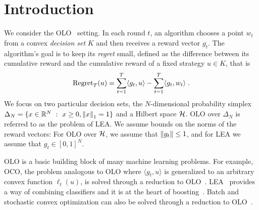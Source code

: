 \section{Introduction}
\label{section:introduction}

\vspace{-0.2cm}

We consider the \ac{OLO}~\cite{Cesa-Bianchi-Lugosi-2006, Shalev-Shwartz-2011}
setting. In each round $t$, an algorithm chooses a point $w_t$ from a convex
\emph{decision set} $K$ and then receives a reward vector $g_t$. The
algorithm's goal is to keep its \emph{regret} small, defined as the difference
between its cumulative reward and the cumulative reward of a fixed strategy $u
\in K$, that is
\vspace{-.1cm}
\[
\operatorname{Regret}_T(u) = \sum_{t=1}^T \langle g_t, u \rangle - \sum_{t=1}^T \langle g_t, w_t \rangle \; .
\]
We focus on two particular decision sets, the $N$-dimensional probability
simplex $\Delta_N = \{ x \in \mathbb{R}^N ~:~ x \ge 0, \left\|{x}\right\|_1 = 1\}$ and a
Hilbert space $\mathcal{H}$.  \ac{OLO} over $\Delta_N$ is referred to as the problem of
\ac{LEA}.  We assume bounds on the norms of the reward vectors: For \ac{OLO}
over $\mathcal{H}$, we assume that $\left\|{g_t}\right\| \le 1$, and for \ac{LEA} we assume that
$g_t \in [0,1]^N$.

\vspace{-0.1cm}

\ac{OLO} is a basic building block of many machine learning problems. For
example, \ac{OCO}, the problem analogous to \ac{OLO} where $\langle g_t, u
\rangle$ is generalized to an arbitrary convex function $\ell_t(u)$, is solved
through a reduction to \ac{OLO}~\cite{Shalev-Shwartz-2011}.
\ac{LEA}~\cite{Littlestone-Warmuth-1994, Vovk-1998,
Cesa-Bianchi-Freund-Haussler-Helmbold-Schapire-Warmuth-1997} provides a way of
combining classifiers and it is at the heart of
boosting~\cite{Freund-Schapire-1997}. Batch and stochastic convex optimization
can also be solved through a reduction to \ac{OLO}~\cite{Shalev-Shwartz-2011}.

\vspace{-0.1cm}

